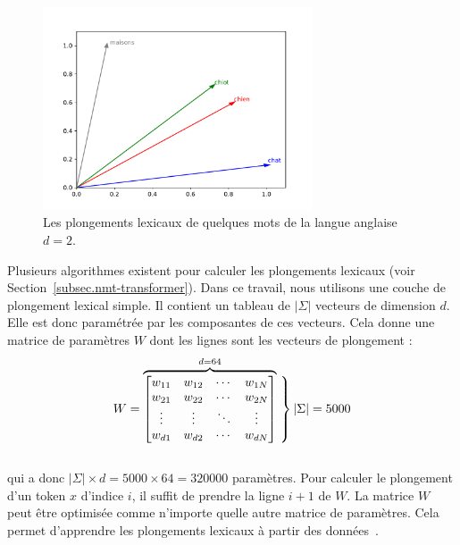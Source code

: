 \begin{figure}[htb]
    \begin{center}
        \includegraphics[width=8cm]{assets/python/word-embeddings.pdf}
    \end{center}
    \caption[Les plongements lexicaux de quelques mots de la langue anglaise.]%
    {Les plongements lexicaux de quelques mots de la langue anglaise \(d=2\).}
    \label{fig.embeddings}
\end{figure}

Plusieurs algorithmes existent pour calculer les plongements lexicaux (voir Section~\ref{subsec.nmt-transformer}).
Dans ce travail, nous utilisons une couche de plongement lexical simple.
Il contient un tableau de \(|\Sigma|\) vecteurs de dimension \(d\).
Elle est donc paramétrée par les composantes de ces vecteurs.
Cela donne une matrice de paramètres \(W\) dont les lignes sont les vecteurs de plongement :
\begin{equation}
    W = \overbrace{
    \begin{bmatrix}
        w_{11} & w_{12} & \cdots & w_{1N}\\
        w_{21} & w_{22} & \cdots & w_{2N}\\
        \vdots & \vdots & \ddots & \vdots\\
        w_{d1} & w_{d2} & \cdots & w_{dN}\\
    \end{bmatrix}}^{d = 64}
    \left.\vphantom{
        \begin{bmatrix}
            w_{11} & w_{12} & \cdots & w_{1N}\\
            w_{21} & w_{22} & \cdots & w_{2N}\\
            \vdots & \vdots & \ddots & \vdots\\
            w_{d1} & w_{d2} & \cdots & w_{dN}\\
        \end{bmatrix}}\right\}|\Sigma| = 5000
\end{equation}\\
qui a donc \(|\Sigma| \times d = 5000 \times 64 = 320000\) paramètres.
Pour calculer le plongement d'un token \(x\) d'indice \(i\), il suffit de prendre la ligne \(i+1\) de \(W\).
La matrice \(W\) peut être optimisée comme n'importe quelle autre matrice de paramètres.
Cela permet d'apprendre les plongements lexicaux à partir des données~\cite{Paszke_et_al_2019}.


